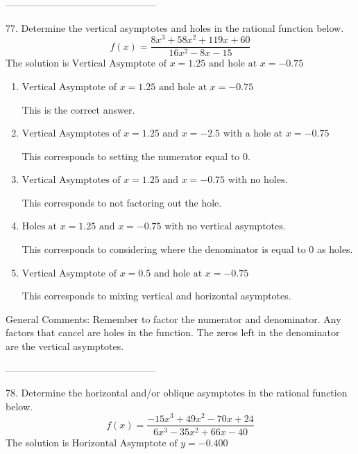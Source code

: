 \documentclass{extbook}[14pt]
\begin{document}
-----------------------------------------------

77. Determine the vertical asymptotes and holes in the rational function below.
\[ f(x) = \frac{8x^{3} +58 x^{2} +119 x + 60}{16x^{2} -8 x -15} \] 
The solution is $ \text{Vertical Asymptote of } x = 1.25 \text{ and hole at } x = -0.75 $ 

\begin{enumerate}[label=\Alph*.] 
\item $ \text{Vertical Asymptote of } x = 1.25 \text{ and hole at } x = -0.75 $ 

 This is the correct answer. 
\item $ \text{Vertical Asymptotes of } x = 1.25 \text{ and } x = -2.5 \text{ with a hole at } x = -0.75 $ 

 This corresponds to setting the numerator equal to 0. 
\item $ \text{Vertical Asymptotes of } x = 1.25 \text{ and } x = -0.75 \text{ with no holes.} $ 

 This corresponds to not factoring out the hole. 
\item $ \text{Holes at } x = 1.25 \text{ and } x = -0.75 \text{ with no vertical asymptotes.} $ 

 This corresponds to considering where the denominator is equal to 0 as holes. 
\item $ \text{Vertical Asymptote of } x = 0.5 \text{ and hole at } x = -0.75 $ 

 This corresponds to mixing vertical and horizontal asymptotes. 
\end{enumerate} 
 
General Comments: Remember to factor the numerator and denominator. Any factors that cancel are holes in the function. The zeros left in the denominator are the vertical asymptotes.

-----------------------------------------------

78. Determine the horizontal and/or oblique asymptotes in the rational function below.
\[ f(x) = \frac{-15x^{3} +49 x^{2} -70 x + 24}{6x^{3} -35 x^{2} +66 x -40} \] 
The solution is $ \text{Horizontal Asymptote of } y = -0.400  $ 
\end{document}
